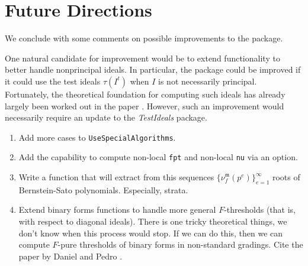\documentclass{amsart}
\newcommand{\idealm}{\mathfrak{m}}
\begin{document}













\newpage
\section{Future Directions}
\label{sec.FutureDirections}

We conclude with some comments on possible improvements to the package.

One natural candidate for improvement would be to extend functionality to better handle nonprincipal ideals.  In particular, the package could be improved if it could use the test ideals $\tau(I^t)$ when $I$ is not necessarily principal.  Fortunately, the theoretical foundation for computing such ideals has already largely been worked out in the paper \cite{SchwedeTuckerTestIdealsOfNonPrincipal}. However, such an improvement would necessarily require an update to the \emph{TestIdeals} package.

\begin{enumerate}
\item Add more cases to {\tt UseSpecialAlgorithms}.
\item Add the capability to compute non-local {\tt fpt} and non-local {\tt nu} via an option.
\item Write a function that will extract from this sequences $\{ \nu_f^{\idealm}(p^e) \}_{e=1}^{\infty}$ roots of Bernstein-Sato polynomials.  Especially, strata.

\item Extend binary forms functions to handle more general $F$-thresholds (that is, with respect to diagonal ideals).  There is one tricky theoretical things, we don't know when this process would stop.  If we can do this, then we can compute $F$-pure thresholds of binary forms in non-standard gradings.  Cite the paper by Daniel and Pedro \cite{HernandezTeixeiraFThresholdFunctions}.
\end{enumerate}




\end{document}
